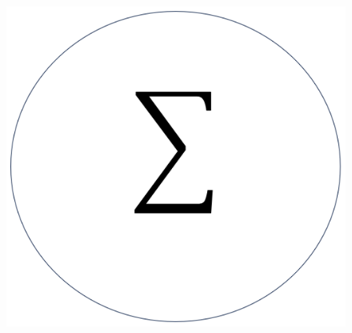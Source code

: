 \documentclass[a4j,dvipdfmx]{jsarticle}
\begin{document}
        \begin{figure}
            \centering
            \includegraphics[scale=0.5]{img/QuuNote/icon.png}
        \end{figure}    

        
\end{document}
